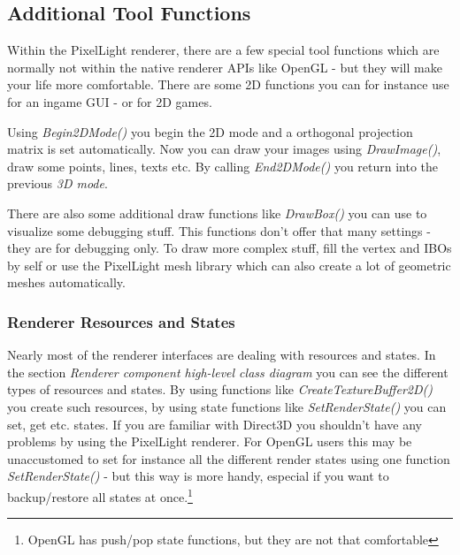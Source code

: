 \subsection{Additional Tool Functions}
Within the PixelLight renderer, there are a few special tool functions which are normally not within the native renderer \ac{API}s like \ac{OpenGL} - but they will make your life more comfortable. There are some 2D functions you can for instance use for an ingame \ac{GUI} - or for 2D games.

Using \emph{Begin2DMode()} you begin the 2D mode and a orthogonal projection matrix is set automatically. Now you can draw your images using \emph{DrawImage()}, draw some points, lines, texts etc. By calling \emph{End2DMode()} you return into the previous \emph{3D mode}.

There are also some additional draw functions like \emph{DrawBox()} you can use to visualize some debugging stuff. This functions don't offer that many settings - they are for debugging only. To draw more complex stuff, fill the vertex and \ac{IBO}s by self or use the PixelLight mesh library which can also create a lot of geometric meshes automatically.



\subsubsection{Renderer Resources and States}
Nearly most of the renderer interfaces are dealing with resources and states. In the section \emph{Renderer component high-level class diagram} you can see the different types of resources and states. By using functions like \emph{CreateTextureBuffer2D()} you create such resources, by using state functions like \emph{SetRenderState()} you can set, get etc. states. If you are familiar with Direct3D you shouldn't have any problems by using the PixelLight renderer. For \ac{OpenGL} users this may be unaccustomed to set for instance all the different render states using one function \emph{SetRenderState()} - but this way is more handy, especial if you want to backup/restore all states at once.\footnote{\ac{OpenGL} has push/pop state functions, but they are not that comfortable}



